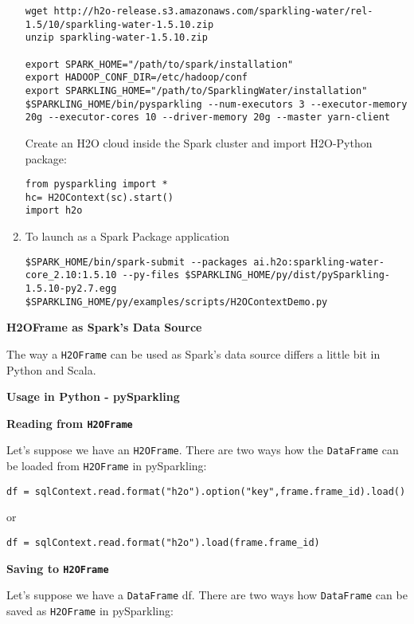 \begin{enumerate}
\begin{lstlisting}[style=Bash]
wget http://h2o-release.s3.amazonaws.com/sparkling-water/rel-1.5/10/sparkling-water-1.5.10.zip
unzip sparkling-water-1.5.10.zip
 
export SPARK_HOME="/path/to/spark/installation"
export HADOOP_CONF_DIR=/etc/hadoop/conf
export SPARKLING_HOME="/path/to/SparklingWater/installation"
$SPARKLING_HOME/bin/pysparkling --num-executors 3 --executor-memory 20g --executor-cores 10 --driver-memory 20g --master yarn-client
\end{lstlisting}
    
Create an H2O cloud inside the Spark cluster and import H2O-Python package:
\begin{lstlisting}[style=Scala]
from pysparkling import *
hc= H2OContext(sc).start()
import h2o
\end{lstlisting}

\item To launch as a Spark Package application
\begin{lstlisting}[style=Bash]
$SPARK_HOME/bin/spark-submit --packages ai.h2o:sparkling-water-core_2.10:1.5.10 --py-files $SPARKLING_HOME/py/dist/pySparkling-1.5.10-py2.7.egg
$SPARKLING_HOME/py/examples/scripts/H2OContextDemo.py 
\end{lstlisting}
\end{enumerate}

\textbf{H2OFrame as Spark's Data Source}

The way a \texttt{H2OFrame} can be used as Spark's data source differs a little bit in Python and Scala.

\textbf{Usage in Python - pySparkling}

\textbf{Reading from \texttt{H2OFrame}}

Let's suppose we have an \texttt{H2OFrame}. There are two ways how the \texttt{DataFrame} can be loaded from \texttt{H2OFrame} in pySparkling:
\begin{lstlisting}[style=Scala]
df = sqlContext.read.format("h2o").option("key",frame.frame_id).load()
\end{lstlisting}
or
\begin{lstlisting}[style=Scala]
df = sqlContext.read.format("h2o").load(frame.frame_id)
\end{lstlisting}

\textbf{Saving to \texttt{H2OFrame}}

Let's suppose we have a \texttt{DataFrame} df. There are two ways how \texttt{DataFrame} can be saved as 
\texttt{H2OFrame} in pySparkling:


